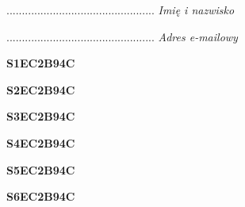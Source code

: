 \begin{turn}{90}\begin{minipage}{\linewidth} \vspace{20mm} ................................................  \textit{Imię i nazwisko}\end{minipage}\end{turn}

\begin{turn}{90}\begin{minipage}{\linewidth} \vspace{20mm} ................................................  \textit{Adres e-mailowy}\end{minipage}\end{turn}

\begin{turn}{90}\huge \begin{minipage}{\linewidth} \vspace{10mm}\textbf{S1EC2B94C}\end{minipage}\end{turn}

\begin{turn}{90}\huge \begin{minipage}{\linewidth} \vspace{10mm}\textbf{S2EC2B94C}\end{minipage}\end{turn}

\begin{turn}{90}\huge \begin{minipage}{\linewidth} \vspace{10mm}\textbf{S3EC2B94C}\end{minipage}\end{turn}

\begin{turn}{90}\huge \begin{minipage}{\linewidth} \vspace{10mm}\textbf{S4EC2B94C}\end{minipage}\end{turn}

\begin{turn}{90}\huge \begin{minipage}{\linewidth} \vspace{10mm}\textbf{S5EC2B94C}\end{minipage}\end{turn}

\begin{turn}{90}\huge \begin{minipage}{\linewidth} \vspace{10mm}\textbf{S6EC2B94C}\end{minipage}\end{turn}

